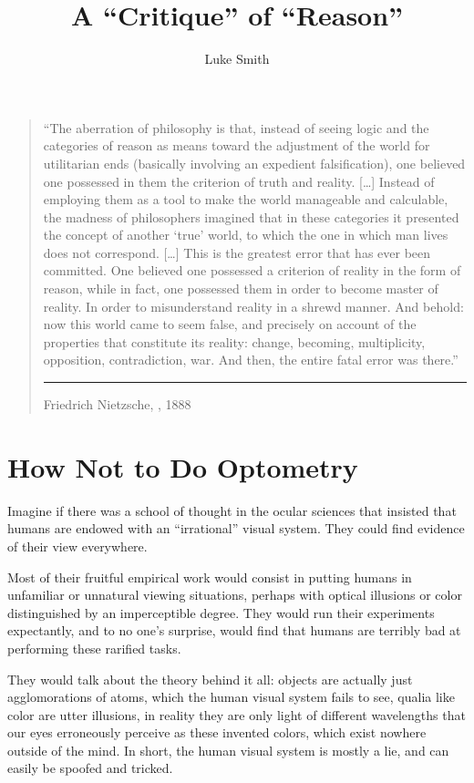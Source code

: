 \documentclass{article}
\title{A ``Critique'' of ``Reason''}
\author{Luke Smith}
\begin{document}
\maketitle

\begin{quote}
``The aberration of philosophy is that, instead of seeing logic and the categories of reason as means toward the adjustment of the world for utilitarian ends (basically involving an expedient falsification), one believed one possessed in them the criterion of truth and reality.
	[\ldots]
Instead of employing them as a tool to make the world manageable and calculable, the madness of philosophers imagined that in these categories it presented the concept of another `true' world, to which the one in which man lives does not correspond.
	[\ldots]
This is the greatest error that has ever been committed.
One believed one possessed a criterion of reality in the form of reason, while in fact, one possessed them in order to become master of reality.
In order to misunderstand reality in a shrewd manner.
And behold: now this world came to seem false, and precisely on account of the properties that constitute its reality: change, becoming, multiplicity, opposition, contradiction, war.
And then, the entire fatal error was there.''
	\vspace{.25cm}\hrule
	\hfill Friedrich Nietzsche, , 1888
\end{quote}

\section{How Not to Do Optometry}

Imagine if there was a school of thought in the ocular sciences that insisted that humans are endowed with an ``irrational'' visual system.
They could find evidence of their view everywhere.

Most of their fruitful empirical work would consist in putting humans in unfamiliar or unnatural viewing situations, perhaps with optical illusions or color distinguished by an imperceptible degree.
They would run their experiments expectantly, and to no one's surprise, would find that humans are terribly bad at performing these rarified tasks.

They would talk about the theory behind it all: objects are actually just agglomorations of atoms, which the human visual system fails to see, qualia like color are utter illusions, in reality they are only light of different wavelengths that our eyes erroneously perceive as these invented colors, which exist nowhere outside of the mind.
In short, the human visual system is mostly a lie, and can easily be spoofed and tricked.
\end{document}
